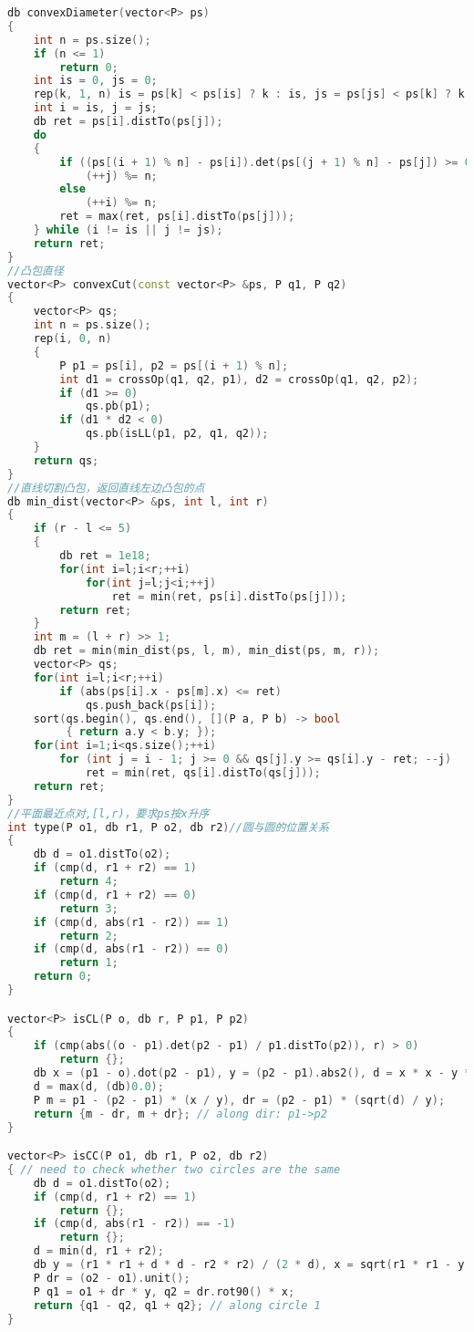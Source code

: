 \begin{lstlisting}[language=C++]
db convexDiameter(vector<P> ps)
{
    int n = ps.size();
    if (n <= 1)
        return 0;
    int is = 0, js = 0;
    rep(k, 1, n) is = ps[k] < ps[is] ? k : is, js = ps[js] < ps[k] ? k : js;
    int i = is, j = js;
    db ret = ps[i].distTo(ps[j]);
    do
    {
        if ((ps[(i + 1) % n] - ps[i]).det(ps[(j + 1) % n] - ps[j]) >= 0)
            (++j) %= n;
        else
            (++i) %= n;
        ret = max(ret, ps[i].distTo(ps[j]));
    } while (i != is || j != js);
    return ret;
}
//凸包直径
vector<P> convexCut(const vector<P> &ps, P q1, P q2)
{
    vector<P> qs;
    int n = ps.size();
    rep(i, 0, n)
    {
        P p1 = ps[i], p2 = ps[(i + 1) % n];
        int d1 = crossOp(q1, q2, p1), d2 = crossOp(q1, q2, p2);
        if (d1 >= 0)
            qs.pb(p1);
        if (d1 * d2 < 0)
            qs.pb(isLL(p1, p2, q1, q2));
    }
    return qs;
}
//直线切割凸包，返回直线左边凸包的点
db min_dist(vector<P> &ps, int l, int r)
{
    if (r - l <= 5)
    {
        db ret = 1e18;
        for(int i=l;i<r;++i)
            for(int j=l;j<i;++j)
                ret = min(ret, ps[i].distTo(ps[j]));
        return ret;
    }
    int m = (l + r) >> 1;
    db ret = min(min_dist(ps, l, m), min_dist(ps, m, r));
    vector<P> qs;
    for(int i=l;i<r;++i)
        if (abs(ps[i].x - ps[m].x) <= ret)
            qs.push_back(ps[i]);
    sort(qs.begin(), qs.end(), [](P a, P b) -> bool
         { return a.y < b.y; });
    for(int i=1;i<qs.size();++i) 
        for (int j = i - 1; j >= 0 && qs[j].y >= qs[i].y - ret; --j)
            ret = min(ret, qs[i].distTo(qs[j]));
    return ret;
}
//平面最近点对,[l,r)，要求ps按x升序
int type(P o1, db r1, P o2, db r2)//圆与圆的位置关系
{
    db d = o1.distTo(o2);
    if (cmp(d, r1 + r2) == 1)
        return 4;
    if (cmp(d, r1 + r2) == 0)
        return 3;
    if (cmp(d, abs(r1 - r2)) == 1)
        return 2;
    if (cmp(d, abs(r1 - r2)) == 0)
        return 1;
    return 0;
}

vector<P> isCL(P o, db r, P p1, P p2)
{
    if (cmp(abs((o - p1).det(p2 - p1) / p1.distTo(p2)), r) > 0)
        return {};
    db x = (p1 - o).dot(p2 - p1), y = (p2 - p1).abs2(), d = x * x - y * ((p1 - o).abs2() - r * r);
    d = max(d, (db)0.0);
    P m = p1 - (p2 - p1) * (x / y), dr = (p2 - p1) * (sqrt(d) / y);
    return {m - dr, m + dr}; // along dir: p1->p2
}

vector<P> isCC(P o1, db r1, P o2, db r2)
{ // need to check whether two circles are the same
    db d = o1.distTo(o2);
    if (cmp(d, r1 + r2) == 1)
        return {};
    if (cmp(d, abs(r1 - r2)) == -1)
        return {};
    d = min(d, r1 + r2);
    db y = (r1 * r1 + d * d - r2 * r2) / (2 * d), x = sqrt(r1 * r1 - y * y);
    P dr = (o2 - o1).unit();
    P q1 = o1 + dr * y, q2 = dr.rot90() * x;
    return {q1 - q2, q1 + q2}; // along circle 1
}


\end{lstlisting}
